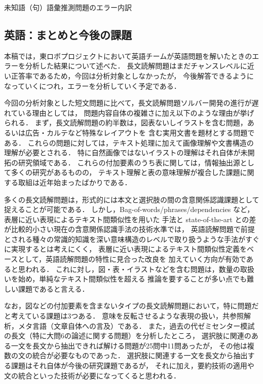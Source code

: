 \documentclass[japanese]{jnlp_1.4b}
\begin{document}
\begin{table}[b]
\caption{未知語（句）語彙推測問題のエラー内訳}
\label{tab:eigo:3a} 

\end{table}


\subsection{英語：まとめと今後の課題}
\label{sec:eigo:summary}

本稿では，東ロボプロジェクトにおいて英語チームが英語問題を解いたときのエラーを分析した結果について述べた．
長文読解問題はまだチャンスレベルに近い正答率であるため，今回は分析対象としなかったが，
今後解答できるようになっていくにつれ，エラーを分析していく予定である．

今回の分析対象とした短文問題に比べて，長文読解問題ソルバー開発の進行が遅れている理由としては，
問題内容自体の複雑さに加え以下のような理由が挙げられる．
まず，長文読解問題の約半数は，図表ないしイラストを含む問題，あるいは広告・カルテなど特殊なレイアウトを
含む実用文書を題材とする問題である．
これらの問題に対しては，テキスト処理に加えて画像理解や文書構造の理解が必要とされる．
特に自然画像ではないイラストの理解はそれ自体が未開拓の研究領域である．
これらの付加要素のうち表に関しては，情報抽出源として多くの研究があるものの，
テキスト理解と表の意味理解が複合した課題に関する取組は近年始まったばかりである\cite{pasupat2015compositional}．

多くの長文読解問題は，形式的には本文と選択肢の間の含意関係認識課題として捉えることが可能である．
しかし，Bag-of-words/phrases/dependencies など，表層に近い表現によるテキスト間類似性を用いた
手法と state-of-the-art との差が比較的小さい現在の含意関係認識手法の技術水準では，
英語読解問題で前提とされる種々の常識的知識を深い意味構造のレベルで取り扱うような手法がすぐに実現するとは考えにくく，
表層に近い表現によるテキスト間類似性定義をベースとして，英語読解問題の特性に見合った改良を
加えていく方向が有効であると思われる．
これに対し，図・表・イラストなどを含む問題は，数量の取扱いを始め，単純なテキスト間類似性を超える
推論を要することが多い点でも難しい課題であると言える．

なお，図などの付加要素を含まないタイプの長文読解問題において，特に問題だと考えている課題は3つある．
意味を反転させるような表現の扱い，共参照解析，メタ言語（文章自体への言及）である．
また，過去の代ゼミセンター模試の長文（特に大問6の論述に関する問題）を分析したところ，
選択肢に関連のある一文を長文から抽出できれば解ける問題が25問中11問あったが，
その他は複数の文の統合が必要なものであった．
選択肢に関連する一文を長文から抽出する課題はそれ自体が今後の研究課題である\cite{CLEF13Li}が，
それに加え，要約技術の適用や文の統合といった技術が必要になってくると思われる．
\end{document}
